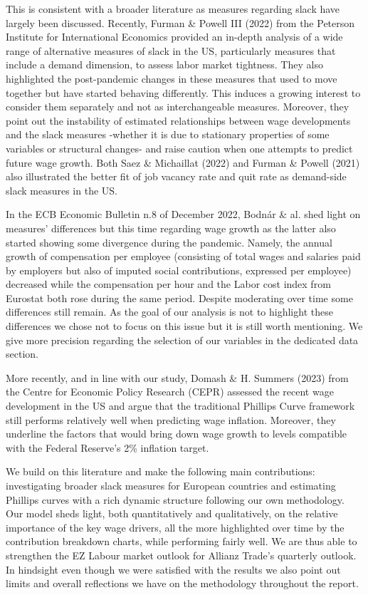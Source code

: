 This is consistent with a broader literature as measures regarding slack have largely been discussed. 
Recently, Furman \& Powell III (2022) from the Peterson Institute for International Economics provided an in-depth analysis of a wide range of alternative measures of slack in the US, particularly measures that include a demand dimension, to assess labor market tightness. 
They also highlighted the post-pandemic changes in these measures that used to move together but have started behaving differently. 
This induces a growing interest to consider them separately and not as interchangeable measures. 
Moreover, they point out the instability of estimated relationships between wage developments and the slack measures -whether it is due to stationary properties of some variables or structural changes- and raise caution when one attempts to predict future wage growth. 
Both Saez \& Michaillat (2022) and Furman \& Powell (2021) also illustrated the better fit of job vacancy rate and quit rate as demand-side slack measures in the US.

In the ECB Economic Bulletin n.8 of December 2022, Bodnár \& al. shed light on measures’ differences but this time regarding wage growth as the latter also started showing some divergence during the pandemic. 
Namely, the annual growth of compensation per employee (consisting of total wages and salaries paid by employers but also of imputed social contributions, expressed per employee) decreased while the compensation per hour and the Labor cost index from Eurostat both rose during the same period. 
Despite moderating over time some differences still remain. 
As the goal of our analysis is not to highlight these differences we chose not to focus on this issue but it is still worth mentioning. 
We give more precision regarding the selection of our variables in the dedicated data section.

More recently, and in line with our study, Domash \& H. Summers (2023) from the Centre for Economic Policy Research (CEPR) assessed the recent wage development in the US and argue that the traditional Phillips Curve framework still performs relatively well when predicting wage inflation. 
Moreover, they underline the factors that would bring down wage growth to levels compatible with the Federal Reserve’s 2\% inflation target.

We build on this literature and make the following main contributions: investigating broader slack measures for European countries and estimating Phillips curves with a rich dynamic structure following our own methodology. 
Our model sheds light, both quantitatively and qualitatively, on the relative importance of the key wage drivers, all the more highlighted over time by the contribution breakdown charts, while performing fairly well. 
We are thus able to strengthen the EZ Labour market outlook for Allianz Trade’s quarterly outlook. 
In hindsight even though we were satisfied with the results we also point out limits and overall reflections we have on the methodology throughout the report.
